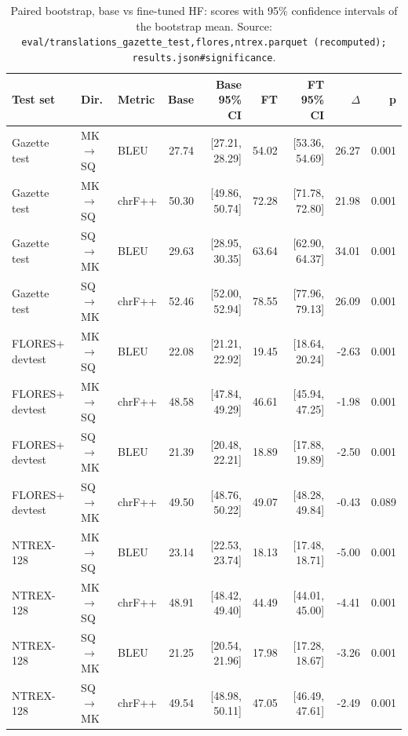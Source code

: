 \begin{table}[t]
\centering
\small
\begin{tabular}{lllrrrrrr}
\toprule
Test set & Dir. & Metric & Base & Base 95\% CI & FT & FT 95\% CI & $\Delta$ & p \\
\midrule
Gazette test & MK$\rightarrow$SQ & BLEU & 27.74 & [27.21, 28.29] & 54.02 & [53.36, 54.69] & 26.27 & 0.001 \\
Gazette test & MK$\rightarrow$SQ & chrF++ & 50.30 & [49.86, 50.74] & 72.28 & [71.78, 72.80] & 21.98 & 0.001 \\
Gazette test & SQ$\rightarrow$MK & BLEU & 29.63 & [28.95, 30.35] & 63.64 & [62.90, 64.37] & 34.01 & 0.001 \\
Gazette test & SQ$\rightarrow$MK & chrF++ & 52.46 & [52.00, 52.94] & 78.55 & [77.96, 79.13] & 26.09 & 0.001 \\
FLORES+ devtest & MK$\rightarrow$SQ & BLEU & 22.08 & [21.21, 22.92] & 19.45 & [18.64, 20.24] & -2.63 & 0.001 \\
FLORES+ devtest & MK$\rightarrow$SQ & chrF++ & 48.58 & [47.84, 49.29] & 46.61 & [45.94, 47.25] & -1.98 & 0.001 \\
FLORES+ devtest & SQ$\rightarrow$MK & BLEU & 21.39 & [20.48, 22.21] & 18.89 & [17.88, 19.89] & -2.50 & 0.001 \\
FLORES+ devtest & SQ$\rightarrow$MK & chrF++ & 49.50 & [48.76, 50.22] & 49.07 & [48.28, 49.84] & -0.43 & 0.089 \\
NTREX-128 & MK$\rightarrow$SQ & BLEU & 23.14 & [22.53, 23.74] & 18.13 & [17.48, 18.71] & -5.00 & 0.001 \\
NTREX-128 & MK$\rightarrow$SQ & chrF++ & 48.91 & [48.42, 49.40] & 44.49 & [44.01, 45.00] & -4.41 & 0.001 \\
NTREX-128 & SQ$\rightarrow$MK & BLEU & 21.25 & [20.54, 21.96] & 17.98 & [17.28, 18.67] & -3.26 & 0.001 \\
NTREX-128 & SQ$\rightarrow$MK & chrF++ & 49.54 & [48.98, 50.11] & 47.05 & [46.49, 47.61] & -2.49 & 0.001 \\
\bottomrule
\end{tabular}
\caption{Paired bootstrap, base vs fine-tuned HF: scores with 95\% confidence intervals of the bootstrap mean. Source: \texttt{eval/translations\_{gazette\_test,flores,ntrex}.parquet (recomputed); results.json\#significance}.}
\label{tab:e01-significance}
\end{table}
